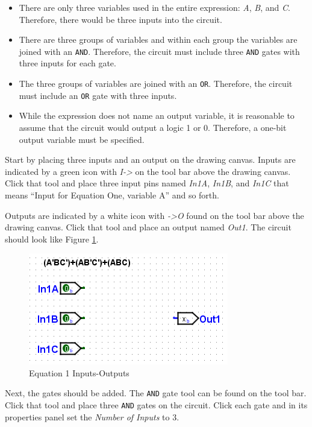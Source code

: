 \begin{itemize}
	\item There are only three variables used in the entire expression: \textit{A}, \textit{B}, and \textit{C}. Therefore, there would be three inputs into the circuit.
	\item There are three groups of variables and within each group the variables are joined with an \texttt{AND}. Therefore, the circuit must include three \texttt{AND} gates with three inputs for each gate.
	\item The three groups of variables are joined with an \texttt{OR}. Therefore, the circuit must include an \texttt{OR} gate with three inputs.
	\item While the expression does not name an output variable, it is reasonable to assume that the circuit would output a logic 1 or 0. Therefore, a one-bit output variable must be specified.
\end{itemize}

Start by placing three inputs and an output on the drawing canvas. Inputs are indicated by a green icon with \textit{I->} on the tool bar above the drawing canvas. Click that tool and place three input pins named \textit{In1A}, \textit{In1B}, and \textit{In1C} \textemdash that means ``Input for Equation One, variable A'' and so forth. 

Outputs are indicated by a white icon with \textit{->O} found on the tool bar above the drawing canvas. Click that tool and place an output named \textit{Out1}. The circuit should look like Figure \ref{fig:bool-01}.

\begin{figure}[H]
	\centering
	\includegraphics[width=\maxwidth{.95\linewidth}]{gfx/bool-01}
	\caption{Equation 1 Inputs-Outputs}
	\label{fig:bool-01}
\end{figure}

Next, the gates should be added. The \texttt{AND} gate tool can be found on the tool bar. Click that tool and place three \texttt{AND} gates on the circuit. Click each gate and in its properties panel set the \textit{Number of Inputs} to 3. 


